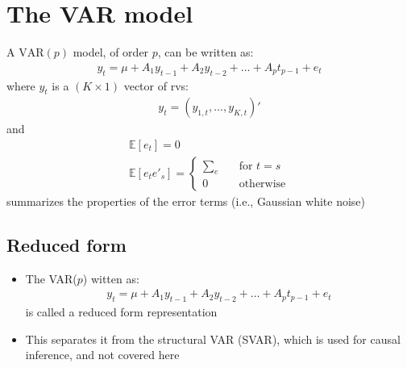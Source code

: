\documentclass[10pt]{article}
\begin{document}
\section{The VAR model}
A $\text{VAR}(p) $ model, of order $p $, can be written as: 
\begin{gather*}
    y_t = \mu + A_1y_{t - 1} + A_2y_{t - 2} + \dots + A_pt_{p - 1} + e_t
\end{gather*}
where $y_t $ is a $(K\times 1) $ vector of rvs: 
\begin{gather*}
    y_t = (y_{1, t}, \dots, y_{K, t})'
\end{gather*}
and 
\begin{align*}
    \mathbb{E}[e_t] = 0 \\
    \mathbb{E}\left[e_te'_s\right] = 
    \begin{cases}
        \sum_e\quad&\text{for }t = s\\
        0\quad&\text{otherwise}
    \end{cases}
\end{align*}
summarizes the properties of the error terms (i.e., Gaussian white noise)
\newpage 
\subsection{Reduced form}
\begin{itemize}
    \item The VAR($p $) witten as: 
    \begin{gather*}
        y_t = \mu + A_1y_{t - 1} + A_2y_{t - 2} + \dots + A_pt_{p - 1} + e_t
    \end{gather*}
    is called a reduced form representation 
    \item This separates it from the structural VAR (SVAR), which is used for causal inference, and not covered here 
\end{itemize}
\end{document}
